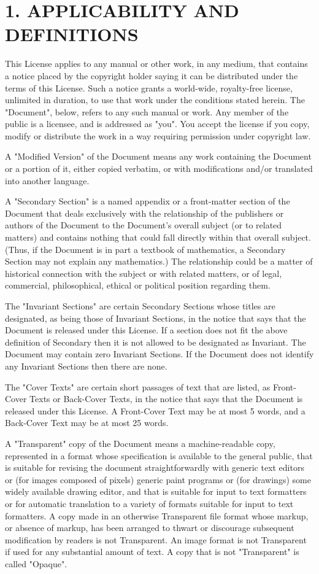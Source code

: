 \section{1. APPLICABILITY AND DEFINITIONS}
This License applies to any manual or other work, in any medium, that contains a notice placed by the copyright holder saying it can be distributed under the terms of this License. Such a notice grants a world-wide, royalty-free license, unlimited in duration, to use that work under the conditions stated herein. The "Document", below, refers to any such manual or work. Any member of the public is a licensee, and is addressed as "you". You accept the license if you copy, modify or distribute the work in a way requiring permission under copyright law.\par
A "Modified Version" of the Document means any work containing the Document or a portion of it, either copied verbatim, or with modifications and/or translated into another language.\par
A "Secondary Section" is a named appendix or a front-matter section of the Document that deals exclusively with the relationship of the publishers or authors of the Document to the Document's overall subject (or to related matters) and contains nothing that could fall directly within that overall subject. (Thus, if the Document is in part a textbook of mathematics, a Secondary Section may not explain any mathematics.) The relationship could be a matter of historical connection with the subject or with related matters, or of legal, commercial, philosophical, ethical or political position regarding them.\par
The "Invariant Sections" are certain Secondary Sections whose titles are designated, as being those of Invariant Sections, in the notice that says that the Document is released under this License. If a section does not fit the above definition of Secondary then it is not allowed to be designated as Invariant. The Document may contain zero Invariant Sections. If the Document does not identify any Invariant Sections then there are none.\par
The "Cover Texts" are certain short passages of text that are listed, as Front-Cover Texts or Back-Cover Texts, in the notice that says that the Document is released under this License. A Front-Cover Text may be at most 5 words, and a Back-Cover Text may be at most 25 words.\par
A "Transparent" copy of the Document means a machine-readable copy, represented in a format whose specification is available to the general public, that is suitable for revising the document straightforwardly with generic text editors or (for images composed of pixels) generic paint programs or (for drawings) some widely available drawing editor, and that is suitable for input to text formatters or for automatic translation to a variety of formats suitable for input to text formatters. A copy made in an otherwise Transparent file format whose markup, or absence of markup, has been arranged to thwart or discourage subsequent modification by readers is not Transparent. An image format is not Transparent if used for any substantial amount of text. A copy that is not "Transparent" is called "Opaque".\par
